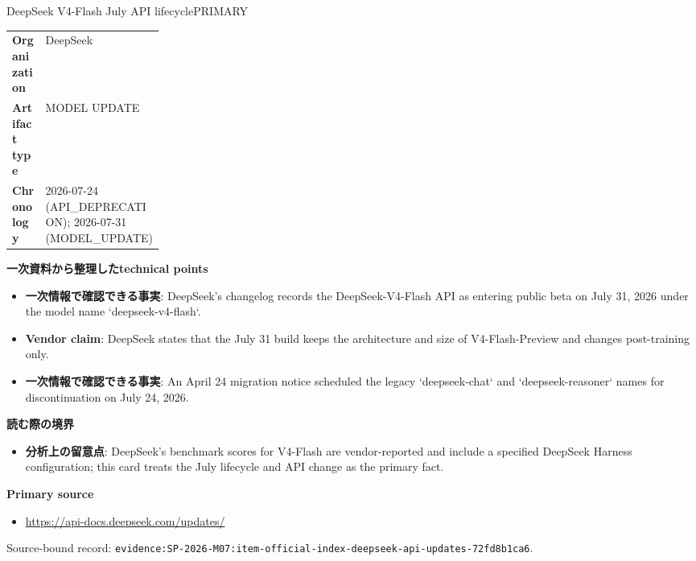 \begin{technicalnote}{DeepSeek V4-Flash July API lifecycle}{PRIMARY}
\begin{tabularx}{\linewidth}{@{}>{\bfseries}p{0.22\linewidth}X@{}}
Organization & DeepSeek \\
Artifact type & MODEL UPDATE \\
Chronology & 2026-07-24 (API\_DEPRECATION); 2026-07-31 (MODEL\_UPDATE) \\
\end{tabularx}
\smallskip
{\bfseries 一次資料から整理したtechnical points}
\begin{itemize}[leftmargin=1.5em,itemsep=0.35em]
\item \textbf{一次情報で確認できる事実}: DeepSeek's changelog records the DeepSeek-V4-Flash API as entering public beta on July 31, 2026 under the model name `deepseek-v4-flash`.
\item \textbf{Vendor claim}: DeepSeek states that the July 31 build keeps the architecture and size of V4-Flash-Preview and changes post-training only.
\item \textbf{一次情報で確認できる事実}: An April 24 migration notice scheduled the legacy `deepseek-chat` and `deepseek-reasoner` names for discontinuation on July 24, 2026.
\end{itemize}
{\bfseries 読む際の境界}
\begin{itemize}[leftmargin=1.5em,itemsep=0.35em]
\item \textbf{分析上の留意点}: DeepSeek's benchmark scores for V4-Flash are vendor-reported and include a specified DeepSeek Harness configuration; this card treats the July lifecycle and API change as the primary fact.
\end{itemize}
{\bfseries Primary source}
\begingroup\sloppy
\begin{itemize}[leftmargin=1.5em,itemsep=0.25em]
\item {\scriptsize\url{https://api-docs.deepseek.com/updates/}}
\end{itemize}
\endgroup
{\scriptsize\color{SurveyMuted}Source-bound record: \texttt{evidence:SP-2026-M07:item-official-index-deepseek-api-updates-72fd8b1ca6}.}
\end{technicalnote}
\medskip

